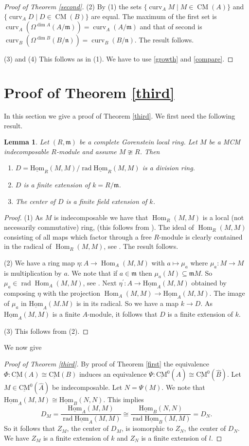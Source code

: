 \documentclass{amsart}
\newcommand{\n}{\mathfrak{n} }
\newcommand{\m}{\mathfrak{m} }
\newcommand{\rt}{\rightarrow}
\newcommand{\wh}{\widehat }
\newcommand{\curv}{\operatorname{curv}}
\newcommand{\rad}{\operatorname{rad}}
\newcommand{\CMS}{\operatorname{\underline{CM}}}
\newcommand{\CMa}{\operatorname{CM}}
\newcommand{\Hom}{\operatorname{Hom}}
\newcommand{\sHom}{\operatorname{\underline{Hom}}}
\theoremstyle{plain}
\newtheorem{lemma}[theorem]{Lemma}
\theoremstyle{definition}
\theoremstyle{remark}
\begin{document}
{\begin{proof}[Proof of Theorem \ref{second}]
 (2) By (1) the sets $\{ \curv_A M \mid M \in \CMa(A) \}$ and  $\{ \curv_A D \mid D \in \CMa(B) \}$ are equal. The maximum of the first set is $\curv_A(\Omega^{\dim A}(A/\m)) = \curv_A(A/\m)$ and that of second is  $\curv_B(\Omega^{\dim B}(B/\n)) = \curv_B(B/\n)$. The result follows.

 (3) and (4) This follows as in (1). We have to use \ref{growth} and \ref{compare}.
\end{proof}
\section{Proof of Theorem \ref{third}}
In this section we give a proof of Theorem \ref{third}. We first need the following result.
\begin{lemma}
  Let $(R,\m)$ be a complete Gorenstein local ring. Let $M$ be a MCM indecomposable $R$-module and  assume $M \ncong R$. Then
  \begin{enumerate}[\rm (1)]
    \item $D = \sHom_R(M,M)/\rad \sHom_R(M,M)$ is a division ring.
    \item $D$ is a finite extension of $k = R/\m$.
    \item The center of $D$ is a finite field extension of $k$.
  \end{enumerate}
\end{lemma}
\begin{proof}
(1) As $M$ is indecomposable we have that $\Hom_R(M,M)$  is a local (not necessarily commutative) ring, (this follows from \cite[21.35]{Lam}). The ideal of $\Hom_R(M,M)$ consisting of all maps which factor through a free $R$-module is clearly contained in the radical of $\Hom_R(M,M)$, see \cite[2.2]{P-ar}. The result follows.

(2) We have a ring map $\eta \colon A \rt \Hom_A(M, M)$ with $a \mapsto \mu_a$ where $\mu_a \colon M \rt M$ is multiplication by $a$. We note that if $a \in \m$ then $\mu_a(M) \subseteq \m M$.
 So $\mu_a \in \rad \Hom_A(M, M)$, see \cite[2.2]{P-ar}. Next $\eta^\prime \colon A \rt \sHom_A(M, M)$ obtained by composing $\eta$ with the projection $\Hom_A(M, M) \rt \sHom_A(M, M)$. The image of $\mu_a$ in $\sHom_A(M.M)$ is in its radical. So we have a map $k \rt D$. As $\sHom_A(M,M)$ is a finite  $A$-module, it follows that $D$ is a finite extension of $k$.

(3) This follows from (2).
\end{proof}
We now give
\begin{proof}[Proof of Theorem \ref{third}]
By proof of Theorem \ref{first} the equivalence $\Phi \colon \CMS(A) \cong \CMS(B)$ induces an equivalence $\Psi \colon \CMS^0(\wh{A}) \cong \CMS^0(\wh{B})$. Let $M \in \CMS^0(\wh{A})$ be indecomposable.  Let $N = \Psi(M)$. We note that $\sHom_A(M, M) \cong \sHom_B(N,N)$. This implies
$$D_M = \frac{\sHom_A(M, M)}{\rad \sHom_A(M,M)} \cong \frac{\sHom_B(N, N)}{\rad \sHom_B(M,M)} = D_N.$$
So it follows that $Z_M$, the center of $D_M$, is isomorphic to $Z_N$, the center of $D_N$.
We have $Z_M$ is a finite extension of $k$ and $Z_N$ is a finite extension of $l$.


\end{proof}}
\end{document}
